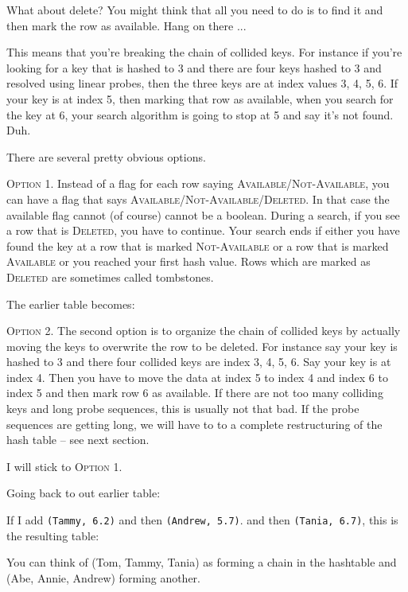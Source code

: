 What about delete?
You might think that all you need to do is to find it
and then mark the row as available.
Hang on there ...

This means that you're breaking the chain of collided keys.
For instance if you're looking for a key that is hashed to
3 and there are four keys hashed to 3 and resolved using linear 
probes, then the three keys are at index values 3, 4, 5, 6.
If your key is at index 5, then marking that row as available,
when you search for the key at 6, your search algorithm is
going to stop at 5 and say it's not found. Duh.

There are several pretty obvious options.

\textsc{Option 1.}
Instead of a flag for each row saying
\textsc{Available}/\textsc{Not-Available},
you can have a flag that says
\textsc{Available}/\textsc{Not-Available}/\textsc{Deleted}.
In that case the available flag cannot (of course) cannot be a boolean.
During a search, if you see a row that is \textsc{Deleted},
you have to continue.
Your search ends if either you have found the key at a row that is
marked \textsc{Not-Available} or a row that is marked
\textsc{Available} or you reached
your first hash value.
Rows which are marked as \textsc{Deleted} are sometimes called tombstones.

The earlier table becomes:


\textsc{Option 2.}
The second option is to organize the chain of collided keys by 
actually moving the keys to overwrite the row to be deleted.
For instance say your key is hashed to 3 and there four 
collided keys are index 3, 4, 5, 6.
Say your key is at index 4.
Then you have to move the data at index 5 to index 4 and index 6 to index 5
and then mark row 6 as available.
If there are not too many colliding keys and long probe sequences,
this is usually not that bad.
If the probe sequences are getting long, we will have to to a 
complete restructuring of the hash table -- see next section.

I will stick to \textsc{Option 1}.

Going back to out earlier table:


If I add 
\texttt{(Tammy, 6.2)}
and
then 
\texttt{(Andrew, 5.7)}.
and
then 
\texttt{(Tania, 6.7)},
this is the resulting table:



You can think of (Tom, Tammy, Tania) as forming a chain in the
hashtable and
(Abe, Annie, Andrew) forming another.

